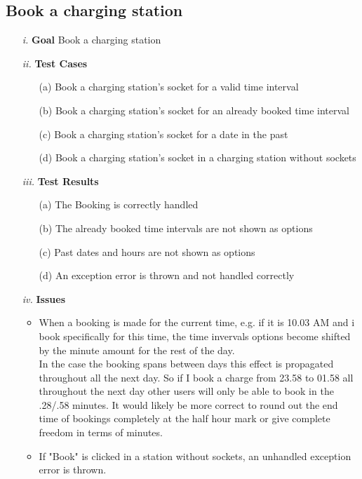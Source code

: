 \documentclass[table, 12pt]{article}
\begin{document}
\subsection{Book a charging station}
\begin{itemize}
    \item[\textit{i.}] \textbf{Goal} Book a charging station
    \item[\textit{ii.}] \textbf{Test Cases}
    \begin{itemize}
        \item[(a)] Book a charging station's socket for a valid time interval
        \item[(b)] Book a charging station's socket for an already booked time interval
        \item[(c)] Book a charging station's socket for a date in the past
        \item[(d)] Book a charging station's socket in a charging station without sockets
    \end{itemize} 
    \item[\textit{iii.}] \textbf{Test Results}
    \begin{itemize}
        \item[(a)] The Booking is correctly handled
        \item[(b)] The already booked time intervals are not shown as options
        \item[(c)] Past dates and hours are not shown as options
        \item[(d)] An exception error is thrown and not handled correctly
    \end{itemize}
    \newpage
    \item[\textit{iv.}] \textbf{Issues}    
    \begin{itemize}
        \item When a booking is made for the current time, e.g. if it is 10.03 AM and i book specifically for this time, the time invervals options become shifted by the minute amount for the rest of the day.\\
        In the case the booking spans between days this effect is propagated throughout all the next day. So if I book a charge from 23.58 to 01.58 all throughout the next day other users will only be able to book in the .28/.58 minutes.
        It would likely be more correct to round out the end time of bookings completely at the half hour mark or give complete freedom in terms of minutes.
        \item If "Book" is clicked in a station without sockets, an unhandled exception error is thrown.
    \end{itemize} 
\end{itemize}
\end{document}
